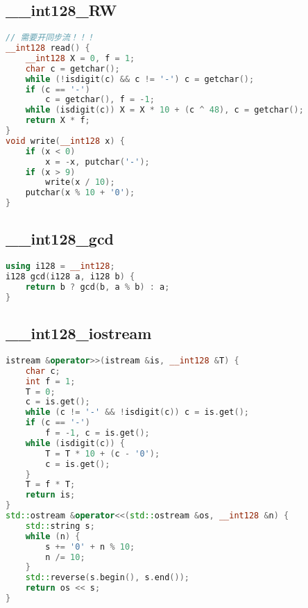 \subsection{\_\_int128\_RW}
\begin{lstlisting}[language=C++]
// 需要开同步流！！！
__int128 read() {
    __int128 X = 0, f = 1;
    char c = getchar();
    while (!isdigit(c) && c != '-') c = getchar();
    if (c == '-')
        c = getchar(), f = -1;
    while (isdigit(c)) X = X * 10 + (c ^ 48), c = getchar();
    return X * f;
}
void write(__int128 x) {
    if (x < 0)
        x = -x, putchar('-');
    if (x > 9)
        write(x / 10);
    putchar(x % 10 + '0');
}
\end{lstlisting}
\subsection{\_\_int128\_gcd}
\begin{lstlisting}[language=C++]
using i128 = __int128;
i128 gcd(i128 a, i128 b) {
    return b ? gcd(b, a % b) : a;
}
\end{lstlisting}
\subsection{\_\_int128\_iostream}
\begin{lstlisting}[language=C++]
istream &operator>>(istream &is, __int128 &T) {
    char c;
    int f = 1;
    T = 0;
    c = is.get();
    while (c != '-' && !isdigit(c)) c = is.get();
    if (c == '-')
        f = -1, c = is.get();
    while (isdigit(c)) {
        T = T * 10 + (c - '0');
        c = is.get();
    }
    T = f * T;
    return is;
}
std::ostream &operator<<(std::ostream &os, __int128 &n) {
    std::string s;
    while (n) {
        s += '0' + n % 10;
        n /= 10;
    }
    std::reverse(s.begin(), s.end());
    return os << s;
}
\end{lstlisting}
